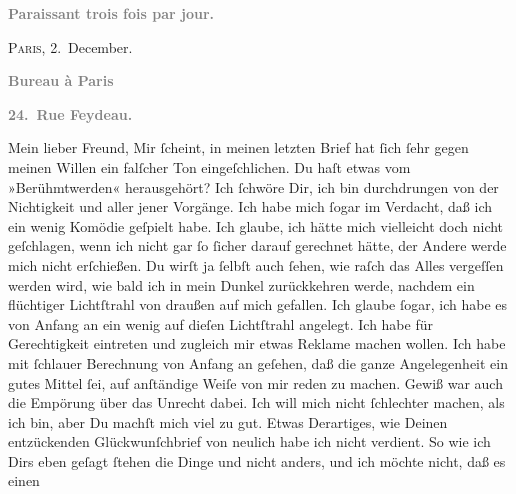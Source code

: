 \begin{ledgroupsized}[t]{13cm}
           \pstart
           \begin{otherlanguage}{french}\textcolor{gray}{\textbf{\textbf{Paraissant trois fois par jour.}}}\end{otherlanguage}\hfill \textsc{Paris}, 2. December.\pend
           \pstart
           \begin{otherlanguage}{french}\textcolor{gray}{\textbf{\textbf{Bureau à Paris}}}\end{otherlanguage}\pend
           \pstart
           \begin{otherlanguage}{french}\textcolor{gray}{\textbf{\textbf{24. Rue Feydeau.}}}\end{otherlanguage}\pend
           \pstart\center{}Mein lieber Freund,\pend\pstart
           Mir ſcheint, in meinen letzten Brief hat ſich ſehr gegen meinen Willen ein falſcher
               Ton eingeſchlichen. Du haſt etwas vom »Berühmtwerden« herausgehört? Ich ſchwöre Dir,
               ich bin durchdrungen von der Nichtigkeit und \label{K_L02794-111v}\label{K_L02794-111h} aller jener Vorgänge. Ich habe mich ſogar im Verdacht,
               daß ich ein  wenig Komödie geſpielt habe. Ich \strikeout{\textcolor{gray}{×}} glaube, ich hätte mich vielleicht doch nicht geſchlagen, wenn ich nicht gar ſo
               ſicher darauf gerechnet hätte, der Andere werde mich nicht erſchießen. Du wirſt ja
               ſelbſt auch ſehen, wie raſch das Alles vergeſſen werden {\pb}wird, wie bald ich in mein Dunkel zurückkehren
               werde, nachdem ein flüchtiger Lichtſtrahl von draußen auf mich gefallen. Ich glaube
               ſogar, ich habe es von Anfang an ein wenig auf dieſen Lichtſtrahl angelegt. Ich habe
               für Gerechtigkeit eintreten und zugleich mir etwas  Reklame machen wollen. Ich habe mit ſchlauer Berechnung von Anfang an
               geſehen, daß die ganze Angelegenheit ein gutes Mittel ſei, auf anſtändige Weiſe von
               mir reden zu machen. Gewiß war auch die Empörung über das Unrecht dabei. Ich will
               mich nicht ſchlechter machen, als ich bin, aber Du machſt {\pb}mich viel zu gut. Etwas Derartiges, wie Deinen
               entzückenden Glückwunſchbrief von neulich habe ich nicht verdient. So wie ich Dirs
               eben geſagt ſtehen die Dinge und nicht anders, und ich möchte nicht, daß es einen

\end{ledgroupsized}
